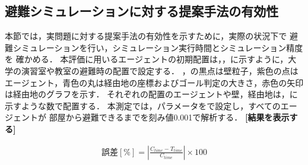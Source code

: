 \clearpage
\subsection{避難シミュレーションに対する提案手法の有効性}
\label{sec:5_real}
本節では，実問題に対する提案手法の有効性を示すために，実際の状況下で
避難シミュレーションを行い，シミュレーション実行時間とシミュレーション精度を
確かめる．
本評価に用いるエージェントの初期配置は，，に示すように，大学の演習室や教室の避難時の配置で設定する．
，の黒点は壁粒子，紫色の点はエージェント，青色の丸は経由地の座標およびゴール判定の大きさ，赤色の矢印は経由地のグラフを示す．
それぞれの配置のエージェントや壁，経由地は，に示すような数で配置する．
本測定では，パラメータをで設定し，すべてのエージェントが
部屋から避難できるまでを刻み値0.001で解析する．
\textbf{
[結果を表示する]
}


\begin{eqnarray}
\label{eq:gosa_hinan}
\mbox{誤差$[\%]$} = \left | \frac{C_{time} - T_{time}}{C_{time}} \right | \times 100
\end{eqnarray}

